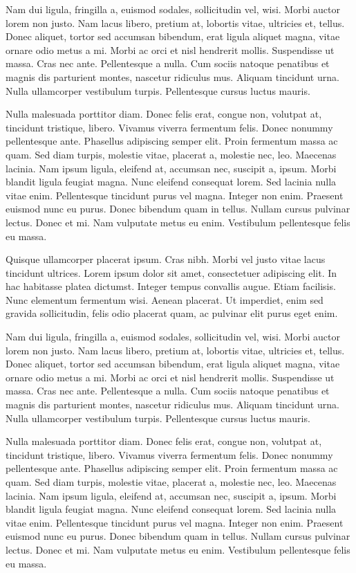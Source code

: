 \documentclass[11pt,fleqn]{book} %
\begin{document}
Nam dui ligula, fringilla a, euismod sodales, sollicitudin vel, wisi. Morbi auctor lorem non justo. Nam lacus libero, pretium at, lobortis vitae, ultricies et, tellus. Donec aliquet, tortor sed accumsan bibendum, erat ligula aliquet magna, vitae ornare odio metus a mi. Morbi ac orci et nisl hendrerit mollis. Suspendisse ut massa. Cras nec ante. Pellentesque a nulla. Cum sociis natoque penatibus et magnis dis parturient montes, nascetur ridiculus mus. Aliquam tincidunt urna. Nulla ullamcorper vestibulum turpis. Pellentesque cursus luctus mauris.

Nulla malesuada porttitor diam. Donec felis erat, congue non, volutpat at, tincidunt tristique, libero. Vivamus viverra fermentum felis. Donec nonummy pellentesque ante. Phasellus adipiscing semper elit. Proin fermentum massa ac quam. Sed diam turpis, molestie vitae, placerat a, molestie nec, leo. Maecenas lacinia. Nam ipsum ligula, eleifend at, accumsan nec, suscipit a, ipsum. Morbi blandit ligula feugiat magna. Nunc eleifend consequat lorem. Sed lacinia nulla vitae enim. Pellentesque tincidunt purus vel magna. Integer non enim. Praesent euismod nunc eu purus. Donec bibendum quam in tellus. Nullam cursus pulvinar lectus. Donec et mi. Nam vulputate metus eu enim. Vestibulum pellentesque felis eu massa.

Quisque ullamcorper placerat ipsum. Cras nibh. Morbi vel justo vitae lacus tincidunt ultrices. Lorem ipsum dolor sit amet, consectetuer adipiscing elit. In hac habitasse platea dictumst. Integer tempus convallis augue. Etiam facilisis. Nunc elementum fermentum wisi. Aenean placerat. Ut imperdiet, enim sed gravida sollicitudin, felis odio placerat quam, ac pulvinar elit purus eget enim.

Nam dui ligula, fringilla a, euismod sodales, sollicitudin vel, wisi. Morbi auctor lorem non justo. Nam lacus libero, pretium at, lobortis vitae, ultricies et, tellus. Donec aliquet, tortor sed accumsan bibendum, erat ligula aliquet magna, vitae ornare odio metus a mi. Morbi ac orci et nisl hendrerit mollis. Suspendisse ut massa. Cras nec ante. Pellentesque a nulla. Cum sociis natoque penatibus et magnis dis parturient montes, nascetur ridiculus mus. Aliquam tincidunt urna. Nulla ullamcorper vestibulum turpis. Pellentesque cursus luctus mauris.

Nulla malesuada porttitor diam. Donec felis erat, congue non, volutpat at, tincidunt tristique, libero. Vivamus viverra fermentum felis. Donec nonummy pellentesque ante. Phasellus adipiscing semper elit. Proin fermentum massa ac quam. Sed diam turpis, molestie vitae, placerat a, molestie nec, leo. Maecenas lacinia. Nam ipsum ligula, eleifend at, accumsan nec, suscipit a, ipsum. Morbi blandit ligula feugiat magna. Nunc eleifend consequat lorem. Sed lacinia nulla vitae enim. Pellentesque tincidunt purus vel magna. Integer non enim. Praesent euismod nunc eu purus. Donec bibendum quam in tellus. Nullam cursus pulvinar lectus. Donec et mi. Nam vulputate metus eu enim. Vestibulum pellentesque felis eu massa.
\end{document}
